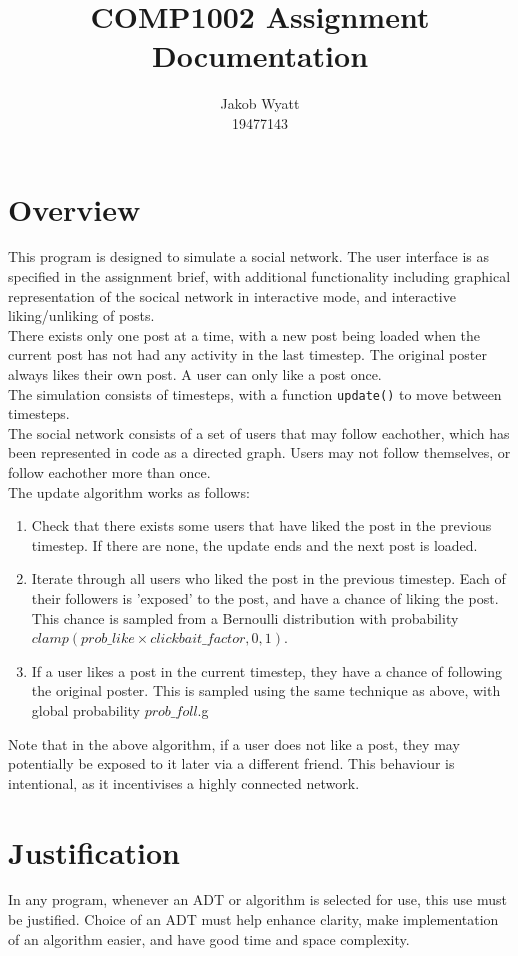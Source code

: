 \documentclass{article}
\title{COMP1002 Assignment\\Documentation}
\author{Jakob Wyatt\\19477143}
\begin{document}
\maketitle
\pagebreak
\section{Overview}
This program is designed to simulate a social network.
The user interface is as specified in the assignment brief,
with additional functionality including graphical representation
of the socical network in interactive mode, and interactive liking/unliking 
of posts.\\
There exists only one post at a time, with a new post being loaded when the current
post has not had any activity in the last timestep. The original poster always
likes their own post. A user can only like a post once.\\
The simulation consists
of timesteps, with a function \texttt{update()} to move between timesteps.\\
The social network consists of a set of users that may follow eachother,
which has been represented in code as a directed graph. Users may not follow themselves,
or follow eachother more than once.\\
The update algorithm works as follows:
\begin{enumerate}
    \item Check that there exists some users that have liked the post in the previous timestep.
            If there are none, the update ends and the next post is loaded.
    \item Iterate through all users who liked the post in the previous timestep.
            Each of their followers is 'exposed' to the post, and have a chance of liking the post.
            This chance is sampled from a Bernoulli distribution with probability
            $\mathit{clamp}(\mathit{prob\_like} \times \mathit{clickbait\_factor}, 0, 1)$.
    \item If a user likes a post in the current timestep, they have a chance of following the
            original poster. This is sampled using the same technique as above, with global probability
            $\mathit{prob\_foll}$.g
\end{enumerate}
Note that in the above algorithm, if a user does not like a post, they may potentially
be exposed to it later via a different friend. This behaviour is intentional, as it incentivises
a highly connected network.

\section{Justification}
In any program, whenever an ADT or algorithm is selected for use, this use must be justified.
Choice of an ADT must help enhance clarity, make implementation of an algorithm easier,
and have good time and space complexity.
\end{document}
